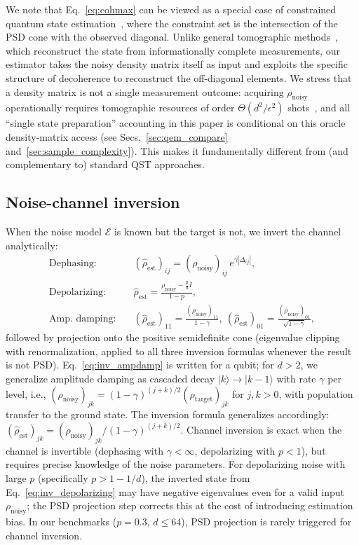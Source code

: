 \documentclass[a4paper,onecolumn]{quantumarticle}
\newcommand{\EE}{\mathcal{E}}
\newcommand{\rhot}{\rho_\mathrm{target}}
\newcommand{\rhon}{\rho_\mathrm{noisy}}
\newcommand{\rhoe}{\hat{\rho}_\mathrm{est}}
\begin{document}
We note that Eq.~\eqref{eq:cohmax} can be viewed as a special case of constrained quantum state estimation~\cite{Hradil1997}, where the constraint set is the intersection of the PSD cone with the observed diagonal.
Unlike general tomographic methods~\cite{Gross2010,Haah2017}, which reconstruct the state from informationally complete measurements, our estimator takes the noisy density matrix itself as input and exploits the specific structure of decoherence to reconstruct the off-diagonal elements.
We stress that a density matrix is not a single measurement outcome: acquiring $\rhon$ operationally requires tomographic resources of order $\Theta(d^2/\epsilon^2)$ shots~\cite{Haah2017}, and all ``single state preparation'' accounting in this paper is conditional on this oracle density-matrix access (see Secs.~\ref{sec:qem_compare} and~\ref{sec:sample_complexity}).
This makes it fundamentally different from (and complementary to) standard QST approaches.

\subsection{Noise-channel inversion}
\label{sec:inversion}

When the noise model $\EE$ is known but the target is not, we invert the channel analytically:
\begin{align}
\text{Dephasing:}\quad & (\rhoe)_{ij} = (\rhon)_{ij}\,e^{\gamma|\Delta_{ij}|}, \label{eq:inv_dephasing}\\
\text{Depolarizing:}\quad & \rhoe = \frac{\rhon - \frac{p}{d}I}{1-p}, \label{eq:inv_depolarizing}\\
\text{Amp.\ damping:}\quad & (\rhoe)_{11} = \frac{(\rhon)_{11}}{1-\gamma},\ (\rhoe)_{01} = \frac{(\rhon)_{01}}{\sqrt{1-\gamma}}, \label{eq:inv_ampdamp}
\end{align}
followed by projection onto the positive semidefinite cone (eigenvalue clipping with renormalization, applied to all three inversion formulas whenever the result is not PSD).
Eq.~\eqref{eq:inv_ampdamp} is written for a qubit; for $d > 2$, we generalize amplitude damping as cascaded decay $|k\rangle \to |k-1\rangle$ with rate $\gamma$ per level, i.e., $(\rhon)_{jk} = (1-\gamma)^{(j+k)/2} (\rhot)_{jk}$ for $j,k > 0$, with population transfer to the ground state.
The inversion formula generalizes accordingly: $(\rhoe)_{jk} = (\rhon)_{jk} / (1-\gamma)^{(j+k)/2}$.
Channel inversion is exact when the channel is invertible (dephasing with $\gamma < \infty$, depolarizing with $p < 1$), but requires precise knowledge of the noise parameters.
For depolarizing noise with large $p$ (specifically $p > 1 - 1/d$), the inverted state from Eq.~\eqref{eq:inv_depolarizing} may have negative eigenvalues even for a valid input $\rhon$; the PSD projection step corrects this at the cost of introducing estimation bias.
In our benchmarks ($p = 0.3$, $d \leq 64$), PSD projection is rarely triggered for channel inversion.
\end{document}
